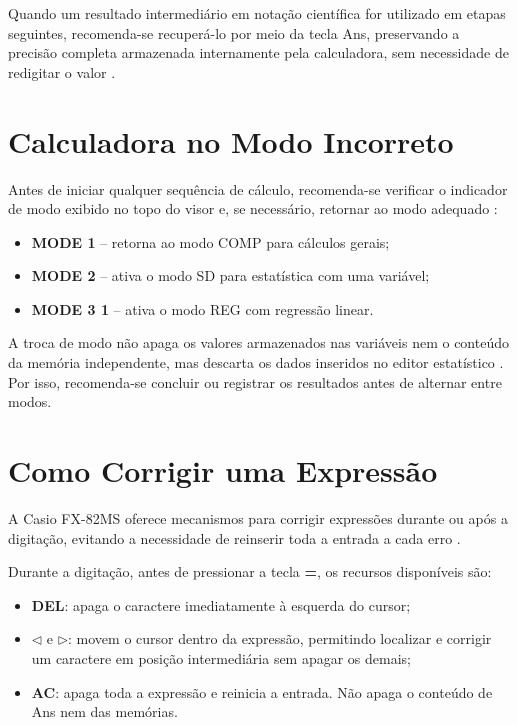 Quando um resultado intermediário em notação científica for utilizado em etapas seguintes, recomenda-se recuperá-lo por meio da tecla Ans, preservando a precisão completa armazenada internamente pela calculadora, sem necessidade de redigitar o valor \cite{casio2004}.

\section{Calculadora no Modo Incorreto}

Antes de iniciar qualquer sequência de cálculo, recomenda-se verificar
o indicador de modo exibido no topo do visor e, se necessário, retornar
ao modo adequado \cite{casio2004}:

\begin{itemize}
    \item \textbf{MODE 1} -- retorna ao modo COMP para cálculos gerais;
    \item \textbf{MODE 2} -- ativa o modo SD para estatística com uma
    variável;
    \item \textbf{MODE 3 1} -- ativa o modo REG com regressão linear.
\end{itemize}

A troca de modo não apaga os valores armazenados nas variáveis nem o
conteúdo da memória independente, mas descarta os dados inseridos no
editor estatístico \cite{casio2004}. Por isso, recomenda-se concluir
ou registrar os resultados antes de alternar entre modos.

\section{Como Corrigir uma Expressão}

A Casio FX-82MS oferece mecanismos para corrigir expressões durante ou após a digitação, evitando a necessidade de reinserir toda a entrada a cada erro \cite{casio2004}.

Durante a digitação, antes de pressionar a tecla \textbf{=}, os recursos disponíveis são:

\begin{itemize}
    \item \textbf{DEL}: apaga o caractere imediatamente à esquerda do cursor;
    \item $\triangleleft$ e $\triangleright$: movem o cursor dentro da expressão, permitindo localizar e corrigir um caractere em posição intermediária sem apagar os demais;
    \item \textbf{AC}: apaga toda a expressão e reinicia a entrada. Não apaga o conteúdo de Ans nem das memórias.
\end{itemize}

